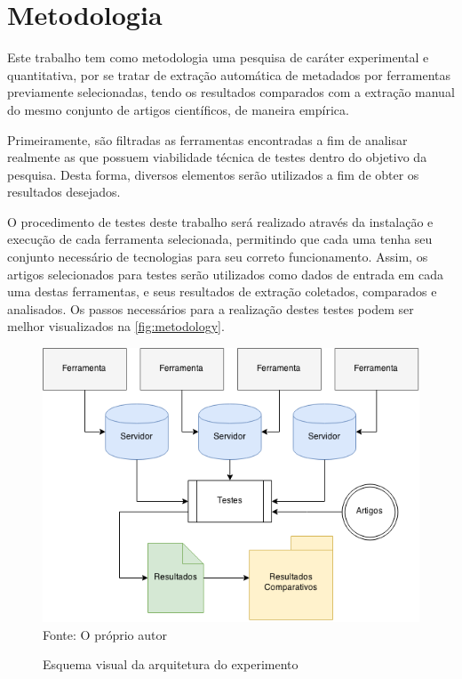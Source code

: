 
\chapter{Metodologia}
\label{cha:methodology}

Este trabalho tem como metodologia uma pesquisa de caráter experimental e quantitativa, por se tratar de extração automática de metadados por ferramentas previamente selecionadas, tendo os resultados comparados com a extração manual do mesmo conjunto de artigos científicos, de maneira empírica.


Primeiramente, são filtradas as ferramentas encontradas a fim de analisar realmente as que possuem viabilidade técnica de testes dentro do objetivo da pesquisa. Desta forma, diversos elementos serão utilizados a fim de obter os resultados desejados.


O procedimento de testes deste trabalho será realizado através da instalação e execução de cada ferramenta selecionada, permitindo que cada uma tenha seu conjunto necessário de tecnologias para seu correto funcionamento. Assim, os artigos selecionados para testes serão utilizados como dados de entrada em cada uma destas ferramentas, e seus resultados de extração coletados, comparados e analisados. Os passos necessários para a realização destes testes podem ser melhor visualizados na \autoref{fig:metodology}.

\begin{figure}[h!]
    \centering
    \caption{Esquema visual da arquitetura do experimento}
    \label{fig:metodology}
    \includegraphics[width=0.8\linewidth]{./assets/images/metodology}
    \center\footnotesize{Fonte: O próprio autor}
\end{figure}


